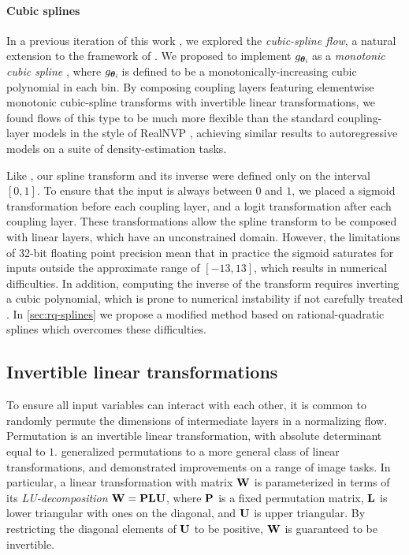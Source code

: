 \paragraph{Cubic splines} 
In a previous iteration of this work
\ifanonymize\citep{anonymous:2019:cubicsplineflows}\else\citep{Durkan:2019:cubicsplineflows}\fi,
we explored the \emph{cubic-spline flow}, a natural extension to the framework of \citet{Muller:2018:nis}. 
We proposed to implement $g_{\bm{\theta}_i}\!$ as a \emph{monotonic cubic spline} \cite{steffen1990simple}, where $g_{\bm{\theta}_i}\!$ is defined to be a monotonically-increasing cubic polynomial in each bin.
By composing coupling layers featuring elementwise monotonic cubic-spline transforms with invertible linear transformations, we found flows of this type to be much more flexible than the standard coupling-layer models in the style of RealNVP \citep{Dinh:2017:rnvp}, achieving similar results to autoregressive models on a suite of density-estimation tasks. 

Like \citet{Muller:2018:nis}, our spline transform and its inverse were defined only on the interval $ [0, 1] $. 
To ensure that the input is always between $0$ and $1$, we placed a sigmoid transformation before each coupling layer, and a logit transformation after each coupling layer. 
These transformations allow the spline transform to be composed with linear layers, which have an unconstrained domain.
However, the limitations of 32-bit floating point precision mean that in practice the sigmoid saturates for inputs outside the approximate range of $ [-13, 13] $, which results in numerical difficulties.
In addition, computing the inverse of the transform requires inverting a cubic polynomial, which is prone to numerical instability if not carefully treated \citep{blinn2007solve}. 
In \cref{sec:rq-splines} we propose a modified method based on rational-quadratic splines which overcomes these difficulties.

\subsection{Invertible linear transformations}
\label{sec:invertible-linear-transformations}
To ensure all input variables can interact with each other, it is common to randomly permute the dimensions of intermediate layers in a normalizing flow. 
Permutation is an invertible linear transformation, with absolute determinant equal to $ 1 $.
\citet{oliva2018tan} generalized permutations to a more general class of linear transformations, and \citet{Kingma:2018:glow} demonstrated improvements on a range of image tasks.
In particular, a linear transformation with matrix $\mathbf{W}$ is parameterized in terms of its \textit{LU-decomposition} $\mathbf{W} = \mathbf{P} \mathbf{L} \mathbf{U}$, where $ \mathbf{P} $ is a fixed permutation matrix, $ \mathbf{L} $ is lower triangular with ones on the diagonal, and $ \mathbf{U} $ is upper triangular. 
By restricting the diagonal elements of $\mathbf{U}$ to be positive, $ \mathbf{W} $ is guaranteed to be invertible.


